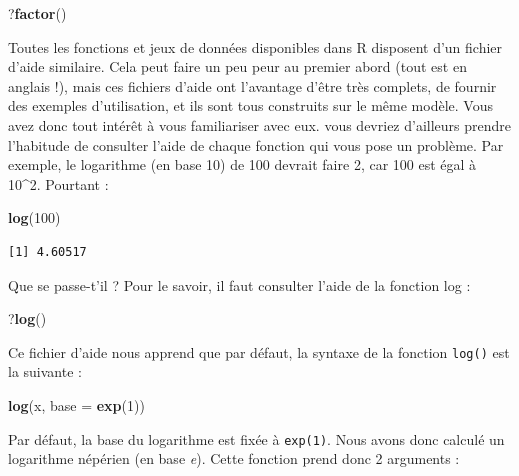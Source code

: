 \documentclass[a4paperpaper,]{article}
\newenvironment{Shaded}{\begin{snugshade}}{\end{snugshade}}
\newcommand{\DataTypeTok}[1]{\textcolor[rgb]{0.00,0.34,0.68}{#1}}
\newcommand{\DecValTok}[1]{\textcolor[rgb]{0.69,0.50,0.00}{#1}}
\newcommand{\KeywordTok}[1]{\textcolor[rgb]{0.12,0.11,0.11}{\textbf{#1}}}
\newcommand{\NormalTok}[1]{\textcolor[rgb]{0.12,0.11,0.11}{#1}}
\theoremstyle{definition}
\theoremstyle{definition}
\theoremstyle{definition}
\theoremstyle{remark}
\begin{document}
\begin{Shaded}
\begin{Highlighting}[]
\NormalTok{?}\KeywordTok{factor}\NormalTok{()}
\end{Highlighting}
\end{Shaded}

Toutes les fonctions et jeux de données disponibles dans R disposent
d'un fichier d'aide similaire. Cela peut faire un peu peur au premier
abord (tout est en anglais !), mais ces fichiers d'aide ont l'avantage
d'être très complets, de fournir des exemples d'utilisation, et ils sont
tous construits sur le même modèle. Vous avez donc tout intérêt à vous
familiariser avec eux. vous devriez d'ailleurs prendre l'habitude de
consulter l'aide de chaque fonction qui vous pose un problème. Par
exemple, le logarithme (en base 10) de 100 devrait faire 2, car 100 est
égal à 10\^{}2. Pourtant :

\begin{Shaded}
\begin{Highlighting}[]
\KeywordTok{log}\NormalTok{(}\DecValTok{100}\NormalTok{)}
\end{Highlighting}
\end{Shaded}

\begin{verbatim}
[1] 4.60517
\end{verbatim}

Que se passe-t'il ? Pour le savoir, il faut consulter l'aide de la
fonction log :

\begin{Shaded}
\begin{Highlighting}[]
\NormalTok{?}\KeywordTok{log}\NormalTok{()}
\end{Highlighting}
\end{Shaded}

Ce fichier d'aide nous apprend que par défaut, la syntaxe de la fonction
\texttt{log()} est la suivante :

\begin{Shaded}
\begin{Highlighting}[]
\KeywordTok{log}\NormalTok{(x, }\DataTypeTok{base =} \KeywordTok{exp}\NormalTok{(}\DecValTok{1}\NormalTok{))}
\end{Highlighting}
\end{Shaded}

Par défaut, la base du logarithme est fixée à \texttt{exp(1)}. Nous
avons donc calculé un logarithme népérien (en base \emph{e}). Cette
fonction prend donc 2 arguments :
\end{document}
